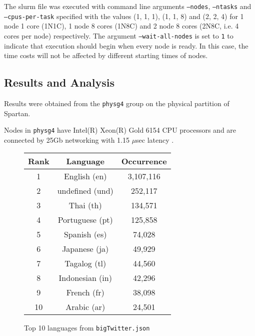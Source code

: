 \documentclass[10pt]{article}
\begin{document}
The slurm file was executed with command line arguments \texttt{--nodes}, \texttt{--ntasks} and \texttt{--cpus-per-task} specified with the values (1, 1, 1), (1, 1, 8) and (2, 2, 4) for 1 node 1 core (1N1C), 1 node 8 cores (1N8C) and 2 node 8 cores (2N8C, i.e. 4 cores per node) respectively. 
The argument \texttt{--wait-all-nodes} is set to \texttt{1} to indicate that execution should begin when every node is ready. In this case, the time costs will not be affected by different starting times of nodes. 


\subsection{Results and Analysis}
Results were obtained from the \texttt{physg4} group on the physical partition of Spartan. 

Nodes in \texttt{physg4} have Intel(R) Xeon(R) Gold 6154 CPU processors and are connected by 25Gb networking with 1.15 $\mu$sec latency \cite{spartan2}. 


\begin{figure}[H]
\begin{center}
\begin{tabular}{ |c|c|c|}
 \hline
 Rank& Language &Occurrence\\
 \hline
1&English (en)& 3,107,116 \\
2& undefined (und)& 252,117\\
3&Thai (th)& 134,571\\
4& Portuguese (pt)& 125,858\\
5& Spanish (es)& 74,028\\
6& Japanese (ja)& 49,929\\
7& Tagalog (tl)& 44,560\\
8& Indonesian (in)& 42,296\\
9&French (fr)& 38,098\\
10& Arabic (ar)& 24,501\\
 \hline
 
\end{tabular}
\caption{Top 10 languages from \texttt{bigTwitter.json}}
\label{lang}
\end{center}
\end{figure}
\end{document}
